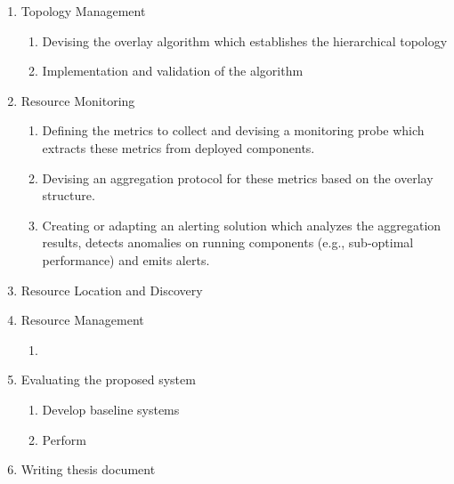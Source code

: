 \begin{enumerate}
    \item Topology Management
    
    \begin{enumerate}
        \item Devising the overlay algorithm which establishes the hierarchical topology
        \item Implementation and validation of the algorithm
    \end{enumerate}
    
    \item Resource Monitoring
    
    \begin{enumerate}
        \item Defining the metrics to collect and devising a monitoring probe which extracts these metrics from deployed components.
        \item Devising an aggregation protocol for these metrics based on the overlay structure.
        \item Creating or adapting an alerting solution which analyzes the aggregation results, detects anomalies on running components (e.g., sub-optimal performance) and emits alerts.
    \end{enumerate}
    
    \item Resource Location and Discovery
    
    \begin{enumerate}
        
    \end{enumerate}
    
    \item Resource Management
    
    \begin{enumerate}
        \item 
    \end{enumerate}

    \item Evaluating the proposed system
    
    \begin{enumerate}
        \item Develop baseline systems
        \item Perform 
    \end{enumerate}

    \item Writing thesis document
    
    

\end{enumerate}




